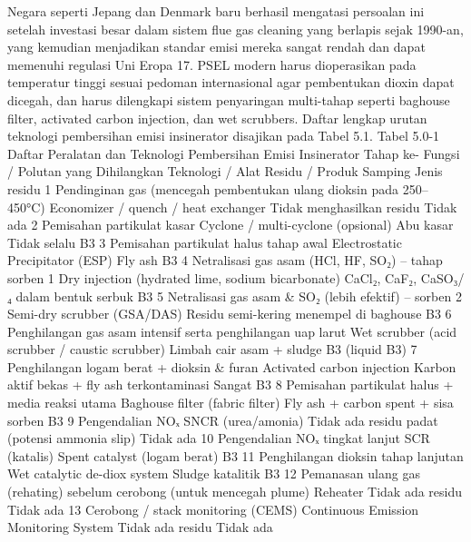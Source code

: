\documentclass[
  letterpaper,
  DIV=11,
  numbers=noendperiod]{scrreprt}
\begin{document}
Negara seperti Jepang dan Denmark baru berhasil mengatasi persoalan ini
setelah investasi besar dalam sistem flue gas cleaning yang berlapis
sejak 1990-an, yang kemudian menjadikan standar emisi mereka sangat
rendah dan dapat memenuhi regulasi Uni Eropa 17. PSEL modern harus
dioperasikan pada temperatur tinggi sesuai pedoman internasional agar
pembentukan dioxin dapat dicegah, dan harus dilengkapi sistem
penyaringan multi-tahap seperti baghouse filter, activated carbon
injection, dan wet scrubbers. Daftar lengkap urutan teknologi
pembersihan emisi insinerator disajikan pada Tabel 5.1. Tabel 5.0-1
Daftar Peralatan dan Teknologi Pembersihan Emisi Insinerator Tahap ke-
Fungsi / Polutan yang Dihilangkan Teknologi / Alat Residu / Produk
Samping Jenis residu 1 Pendinginan gas (mencegah pembentukan ulang
dioksin pada 250--450°C) Economizer / quench / heat exchanger Tidak
menghasilkan residu Tidak ada 2 Pemisahan partikulat kasar Cyclone /
multi-cyclone (opsional) Abu kasar Tidak selalu B3 3 Pemisahan
partikulat halus tahap awal Electrostatic Precipitator (ESP) Fly ash B3
4 Netralisasi gas asam (HCl, HF, SO₂) -- tahap sorben 1 Dry injection
(hydrated lime, sodium bicarbonate) CaCl₂, CaF₂, CaSO₃/₄ dalam bentuk
serbuk B3 5 Netralisasi gas asam \& SO₂ (lebih efektif) -- sorben 2
Semi-dry scrubber (GSA/DAS) Residu semi-kering menempel di baghouse B3 6
Penghilangan gas asam intensif serta penghilangan uap larut Wet scrubber
(acid scrubber / caustic scrubber) Limbah cair asam + sludge B3 (liquid
B3) 7 Penghilangan logam berat + dioksin \& furan Activated carbon
injection Karbon aktif bekas + fly ash terkontaminasi Sangat B3 8
Pemisahan partikulat halus + media reaksi utama Baghouse filter (fabric
filter) Fly ash + carbon spent + sisa sorben B3 9 Pengendalian NOₓ SNCR
(urea/amonia) Tidak ada residu padat (potensi ammonia slip) Tidak ada 10
Pengendalian NOₓ tingkat lanjut SCR (katalis) Spent catalyst (logam
berat) B3 11 Penghilangan dioksin tahap lanjutan Wet catalytic de-diox
system Sludge katalitik B3 12 Pemanasan ulang gas (rehating) sebelum
cerobong (untuk mencegah plume) Reheater Tidak ada residu Tidak ada 13
Cerobong / stack monitoring (CEMS) Continuous Emission Monitoring System
Tidak ada residu Tidak ada
\end{document}
